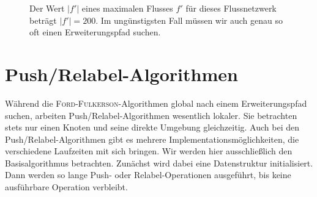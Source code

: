 \documentclass[12pt,a4paper,titlepage,onecolumn,ngerman,bibliography=totocnumbered]{scrartcl}
\theoremstyle{definition}
\theoremstyle{remark}
\newcommand{\ff}{\textsc{Ford-Fulkerson}}
\newcommand{\pr}{Push/Relabel}
\begin{document}
\begin{figure}[H]
	\centering
	\caption{Der Wert $\lvert f'\rvert$ eines maximalen Flusses $f'$ für dieses Flussnetzwerk beträgt $\lvert f'\rvert = 200$.
		Im ungünstigsten Fall müssen wir auch genau so oft einen Erweiterungspfad suchen.}
	\label{fig:bad_path}
\end{figure}

\newpage
\section{\pr -Algorithmen}
Während die \ff -Algorithmen global nach einem Erweiterungspfad suchen, arbeiten \pr -Algorithmen wesentlich lokaler.
Sie betrachten stets nur einen Knoten und seine direkte Umgebung gleichzeitig.
Auch bei den \pr -Algorithmen gibt es mehrere Implementationsmöglichkeiten, die verschiedene Laufzeiten mit sich bringen.
Wir werden hier ausschließlich den Basisalgorithmus betrachten.
Zunächst wird dabei eine Datenstruktur initialisiert.
Dann werden so lange Push- oder Relabel-Operationen ausgeführt, bis keine ausführbare Operation verbleibt.
\end{document}

